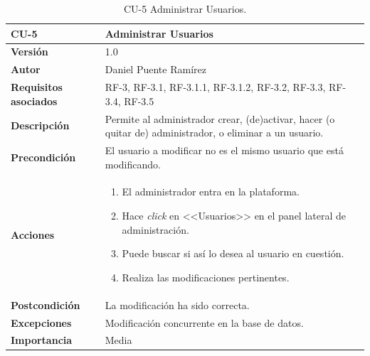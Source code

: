 \begin{table}[p]
\centering
\begin{tabularx}{\linewidth}{ p{} p{} }
\toprule
\textbf{CU-5} & \textbf{Administrar Usuarios}\\
\toprule
\textbf{Versión} & 1.0\\
\textbf{Autor} & Daniel Puente Ramírez\\
\textbf{Requisitos asociados} & RF-3, RF-3.1, RF-3.1.1, RF-3.1.2, RF-3.2, RF-3.3, RF-3.4, RF-3.5\\
\textbf{Descripción} & Permite al administrador crear, (de)activar, hacer (o quitar de) administrador, o eliminar a un usuario.\\
\textbf{Precondición} & El usuario a modificar no es el mismo usuario que está modificando.\\
\textbf{Acciones} &
\begin{enumerate}
\def\labelenumi{\arabic{enumi}.}
\tightlist
\item El administrador entra en la plataforma.
\item Hace \textit{click} en <<Usuarios>> en el panel lateral de administración.
\item Puede buscar si así lo desea al usuario en cuestión.
\item Realiza las modificaciones pertinentes.
\end{enumerate}\\
\textbf{Postcondición} & La modificación ha sido correcta.\\
\textbf{Excepciones} & Modificación concurrente en la base de datos.\\
\textbf{Importancia} & Media \\
\bottomrule
\end{tabularx}
\caption{CU-5 Administrar Usuarios.}
\end{table}


